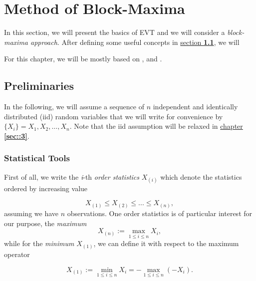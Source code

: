 \documentclass[11pt,a4paper,openany ]{book}
\begin{document}
\setcounter{mtc}{1}
\chapter{Method of Block-Maxima} \label{sec::1}
\vspace{-1cm}
\minitoc \thispagestyle{empty}
 \vspace{1.5cm}

In this section, we will present the basics of EVT and we will consider a 
\textit{block-maxima approach}. After defining some useful concepts in 
\hyperref[sec::1.1]{section \textbf{1.1}}, we will

For this chapter, we will be mostly based on \citet[chapter 3]{coles_introduction_2001}, \citet[chapter 2]{beirlant_statistics_2006} and \citet{reiss_statistical_2007}.

\newpage
\section{Preliminaries}\label{sec::1.1}


In the following, we will assume a sequence of $n$ independent and identically distributed (iid) random variables that we will write for convenience by $\{X_i\}=X_1,X_2,\dots ,X_n$. Note that the iid assumption will be relaxed in \hyperref[sec::3]{chapter \textbf{\ref{sec::3}}}.

\subsection*{Statistical Tools}
First of all, we write the \emph{i}-th \emph{order statistics} $X_{(i)} $ which denote the statistics ordered by increasing value 

\begin{equation} \label{ordereds}
X_{(1)}\leq X_{(2)}\leq ...\leq X_{(n)},
\end{equation}
assuming we have $n$ observations.
One order statistics is of particular interest for our purpose, the \emph{maximum}
\begin{equation} \label{max}
X_{(n)}:=\displaystyle{\max_{1\leq i\leq n}}X_i,
\end{equation}
while for the \emph{minimum} $X_{(1)}$, we can define it with respect to the maximum operator

\begin{equation}\label{min}
X_{(1)}:=\displaystyle{\min_{1\leq i\leq n}}X_i=- \displaystyle{\max_{1\leq i\leq n}}(-X_i).
\end{equation}
\end{document}
